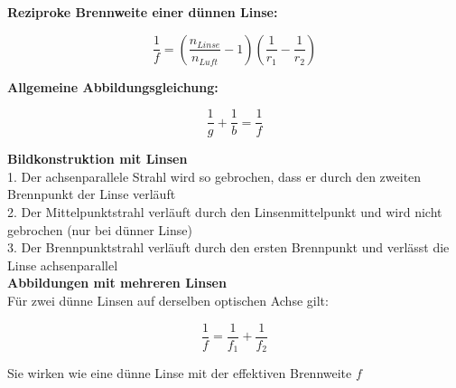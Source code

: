 \textbf{Reziproke Brennweite einer dünnen Linse:}
\begin{formulabox}
    \[
        \frac{1}{f} = \left( \frac{n_{Linse}}{n_{Luft}} -1 \right) \left( \frac{1}{r_1} - \frac{1}{r_2} \right)
    \]
\end{formulabox}

\textbf{Allgemeine Abbildungsgleichung:}
\begin{formulabox}
    \[
        \frac{1}{g} + \frac{1}{b} = \frac{1}{f}
    \]
\end{formulabox}

\textbf{Bildkonstruktion mit Linsen} \\
1. Der achsenparallele Strahl wird so gebrochen, dass er durch den zweiten \\ \hspace{2.3mm} Brennpunkt der Linse verläuft \\
2. Der Mittelpunktstrahl verläuft durch den Linsenmittelpunkt und wird nicht \\ \hspace{2.3mm} gebrochen (nur bei dünner Linse) \\
3. Der Brennpunktstrahl verläuft durch den ersten Brennpunkt und verlässt die \\ \hspace{2.3mm} Linse achsenparallel \\[1ex]

\textbf{Abbildungen mit mehreren Linsen} \\
Für zwei dünne Linsen auf derselben optischen Achse gilt:
\begin{formulabox}
    \[
        \frac{1}{f} = \frac{1}{f_1} + \frac{1}{f_2}
    \]
\end{formulabox}
Sie wirken wie eine dünne Linse mit der effektiven Brennweite $f$
